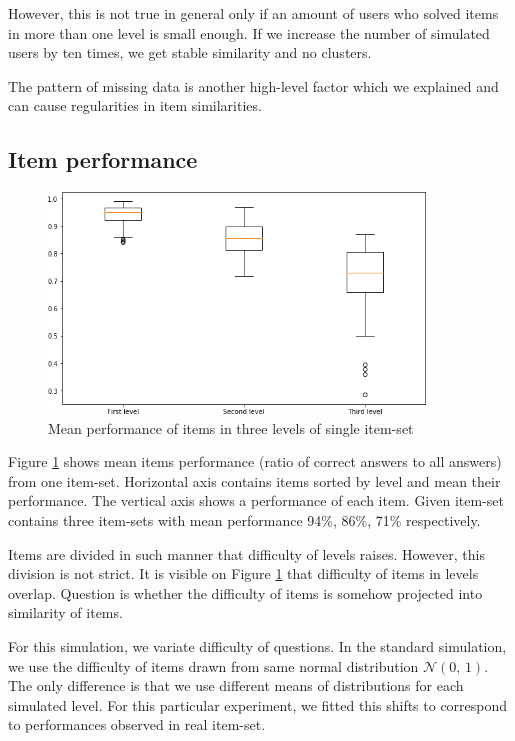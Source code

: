 \documentclass[
  digital, %
  table,   %
  nolof,     %
  nolot,     %
  nocover,
  color,
  final, %
]{fithesis3}
\begin{document}
However, this is not true in general only if an amount of users who solved items in more than one level is small enough. If we increase the number of simulated users by ten times, we get stable similarity and no clusters.

The pattern of missing data is another high-level factor which we explained and can cause regularities in item similarities.


\subsection{Item performance}\label{item-performance}

\begin{figure}
  \includegraphics[width=10cm]{img/items_performance_levels}
  \caption{Mean performance of items in three levels of single item-set}
  \label{fig:item_performance_levels}
\end{figure}

Figure \ref{fig:item_performance_levels} shows mean items performance (ratio of correct answers to all answers) from one item-set. Horizontal axis contains items sorted by level and mean their performance. The vertical axis shows a performance of each item. Given item-set contains three item-sets with mean performance 94\%, 86\%, 71\% respectively.

Items are divided in such manner that difficulty of levels raises. However, this division is not strict. It is visible on Figure \ref{fig:item_performance_levels} that difficulty of items in levels overlap. Question is whether the difficulty of items is somehow projected into similarity of items.

For this simulation, we variate difficulty of questions. In the standard simulation, we use the difficulty of items drawn from same normal distribution $\mathcal{N}(0,\,1)$. The only difference is that we use different means of distributions for each simulated level. For this particular experiment, we fitted this shifts to correspond to performances observed in real item-set.
\end{document}
